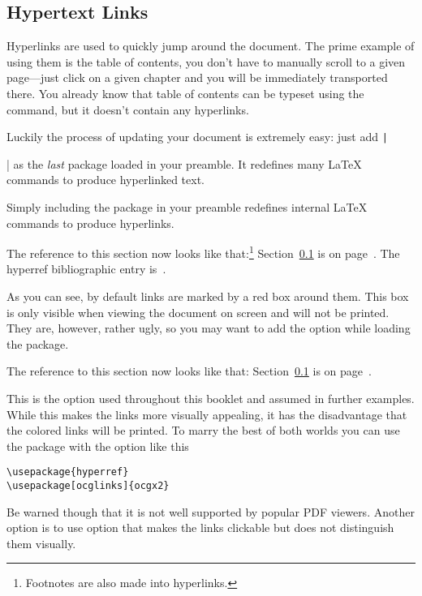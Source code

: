 \subsection{Hypertext Links}\label{hyperlinks}

Hyperlinks are used to quickly jump around the document. The prime example of
using them is the table of contents, you don't have to manually scroll to a
given page---just click on a given chapter and you will be immediately
transported there. You already know that table of contents can be typeset using
the  command, but it doesn't contain any hyperlinks.

Luckily the process of updating your document is extremely easy: just add
\texttt|\usepackage{hyperref}| as the \emph{last} package loaded in
your preamble. It redefines many \LaTeX{} commands to produce hyperlinked text.

Simply including the  package in your preamble redefines
internal \LaTeX{} commands to produce hyperlinks.
\begin{example}
\hypersetup{
  hidelinks,
  pdfborder=0 0 1,
}
\usepackage{hyperref}
The reference to this section
now looks like that:\footnote{
  Footnotes are also
  made into hyperlinks.}
Section~\ref{hyperlinks} is
on page~\pageref{hyperlinks}.
The hyperref bibliographic
entry is~\cite{pack:hyperref}.
\end{example}
As you can see, by default links are marked by a red box around them. This box
is only visible when viewing the document on screen and will not be printed.
They are, however, rather ugly, so you may want to add the 
option while loading the package.
\begin{example}
\usepackage[
  colorlinks
]{hyperref}
The reference to this section
now looks like that:
Section~\ref{hyperlinks} is
on page~\pageref{hyperlinks}.
\end{example}
This is the option used throughout this booklet and assumed in further
examples. While this makes the links more visually appealing, it has the
disadvantage that the colored links will be printed. To marry the best of both
worlds you can use the  package with the option
 like this
\begin{code}  
\begin{verbatim}
\usepackage{hyperref}
\usepackage[ocglinks]{ocgx2}
\end{verbatim}
\end{code}
Be warned though that it is not well supported by popular PDF viewers. Another
option is to use option  that makes the links clickable but
does not distinguish them visually.

